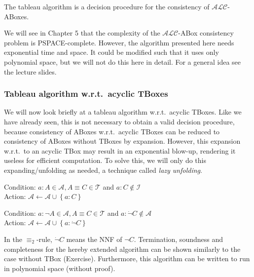 \begin{theorem}
	The tableau algorithm is a decision procedure for the consistency of  $\mathcal{ALC}$-ABoxes.
\end{theorem}
We will see in Chapter 5 that the complexity of the $\mathcal{ALC}$-ABox consistency problem is \textsc{PSPACE}-complete.
However, the algorithm presented here needs exponential time and space.
It could be modified such that it uses only polynomial space, but we will not do this here in detail.
For a general idea see the lecture slides.

\subsubsection{Tableau algorithm w.r.t.\ acyclic TBoxes}
We will now look briefly at a tableau algorithm w.r.t.\ acyclic TBoxes.
Like we have already seen, this is not necessary to obtain a valid decision procedure,
because consistency of ABoxes w.r.t.\ acyclic TBoxes can be reduced to consistency of ABoxes without TBoxes by expansion.
However, this expansion w.r.t.\ to an acyclic TBox may result in an exponential blow-up, rendering it useless for efficient computation.
To solve this, we will only do this expanding/unfolding as needed, a technique called \textit{lazy unfolding}.
\begin{mdframed}[frametitle= The $ \equiv_1$-rule]
	Condition: $a : A \in \mathcal{A}, A  \equiv C \in \mathcal{T}$ and $a:C \notin \mathcal{I}$ \\
	Action: $\mathcal{A} \leftarrow \mathcal{A} \cup \left\{ a:C \right\}$
\end{mdframed}
\begin{mdframed}[frametitle= The $ \equiv_2$-rule, nobreak = true]
	Condition: $a : \neg A \in \mathcal{A}, A \equiv C \in \mathcal{T}$ and $a : \dot{\neg} C \notin \mathcal{A}$ \\
	Action: $\mathcal{A} \leftarrow \mathcal{A} \cup \left\{ a: \dot{\neg}C \right\}$
\end{mdframed}
In the $\equiv_2$-rule, $\dot{\neg}C$ means the NNF of $\neg C$.
Termination, soundness and completeness for the hereby extended algorithm can be shown similarly to the case without TBox (Exercise).
Furthermore, this algorithm can be written to run in polynomial space (without proof).

